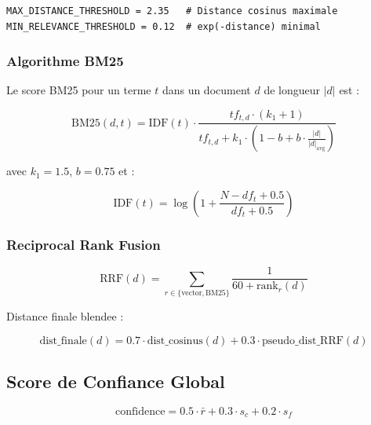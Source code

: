 \documentclass[12pt,a4paper]{article}
\begin{document}
\begin{lstlisting}[style=pythonstyle, caption={Seuils de pertinence (main.py)}]
MAX_DISTANCE_THRESHOLD = 2.35   # Distance cosinus maximale
MIN_RELEVANCE_THRESHOLD = 0.12  # exp(-distance) minimal
\end{lstlisting}

\subsubsection{Algorithme BM25}

Le score BM25 pour un terme $t$ dans un document $d$ de longueur $|d|$ est :

\begin{equation}
\text{BM25}(d, t) = \text{IDF}(t) \cdot
\frac{tf_{t,d} \cdot (k_1 + 1)}{tf_{t,d} + k_1 \cdot \left(1 - b + b \cdot \frac{|d|}{|d|_{\text{avg}}}\right)}
\label{eq:bm25}
\end{equation}

avec $k_1 = 1.5$, $b = 0.75$ et :

\begin{equation}
\text{IDF}(t) = \log\!\left(1 + \frac{N - df_t + 0.5}{df_t + 0.5}\right)
\end{equation}

\subsubsection{Reciprocal Rank Fusion}

\begin{equation}
\text{RRF}(d) = \sum_{r \in \{\text{vector}, \text{BM25}\}} \frac{1}{60 + \text{rank}_r(d)}
\label{eq:rrf}
\end{equation}

Distance finale blendee :

\begin{equation}
\text{dist\_finale}(d) = 0.7 \cdot \text{dist\_cosinus}(d) + 0.3 \cdot \text{pseudo\_dist\_RRF}(d)
\label{eq:blend}
\end{equation}

\subsection{Score de Confiance Global}

\begin{equation}
\text{confidence} = 0.5 \cdot \bar{r} + 0.3 \cdot s_c + 0.2 \cdot s_f
\label{eq:confidence}
\end{equation}
\end{document}
